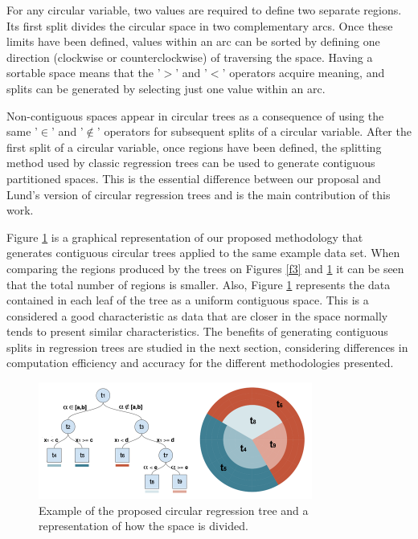 \documentclass[times,twocolumn,final,authoryear]{elsarticle}
\begin{document}
For any circular variable, two values are required to define two separate regions. Its first split divides the circular space in two complementary arcs. Once these limits have been defined, values within an arc can be sorted by defining one direction (clockwise or counterclockwise) of traversing the space. Having a sortable space means that the '$>$' and '$<$' operators acquire meaning, and splits can be generated by selecting just one value within an arc.

Non-contiguous spaces appear in circular trees as a consequence of using the same '$\in$' and '$\notin$' operators for subsequent splits of a circular variable. After the first split of a circular variable, once regions have been defined, the splitting method used by classic regression trees can be used to generate contiguous partitioned spaces. This is the essential difference between our proposal and Lund's version of circular regression trees and is the main contribution of this work.

Figure \ref{f4} is a graphical representation of our proposed methodology that generates contiguous circular trees applied to the same example data set. When comparing the regions produced by the trees on Figures \ref{f3} and \ref{f4} it can be seen that the total number of regions is smaller. Also, Figure \ref{f4} represents the data contained in each leaf of the tree as a uniform contiguous space. This is a considered a good characteristic as data that are closer in the space normally tends to present similar characteristics. The benefits of generating contiguous splits in regression trees are studied in the next section, considering differences in computation efficiency and accuracy for the different methodologies presented.

%
\begin{figure}
  \includegraphics[width=9cm]{fig4_master2.png}
\caption{Example of the proposed circular regression tree and a representation of how the space is divided.}
\label{f4}       %
\end{figure}
%
\end{document}
